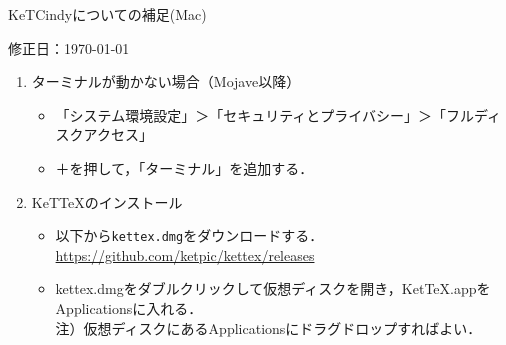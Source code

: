 \documentclass{ujarticle}
\begin{document}
\begin{center}
KeTCindyについての補足(Mac)
\end{center}

\hfill 修正日：\today

\begin{enumerate}[\bf\large 1.]

\item ターミナルが動かない場合（Mojave以降）
\begin{itemize}
\item 「システム環境設定」＞「セキュリティとプライバシー」＞「フルディスクアクセス」
\item ＋を押して，「ターミナル」を追加する．
\end{itemize}

\item KeTTeXのインストール

\begin{itemize}
\item 以下から\verb|kettex.dmg|をダウンロードする．\\
\hspace*{10mm}\url{https://github.com/ketpic/kettex/releases}
\item kettex.dmgをダブルクリックして仮想ディスクを開き，KetTeX.appをApplicationsに入れる．\\
\hspace*{1zw}注）仮想ディスクにあるApplicationsにドラグドロップすればよい．

\end{itemize}


\end{enumerate}
\end{document}
